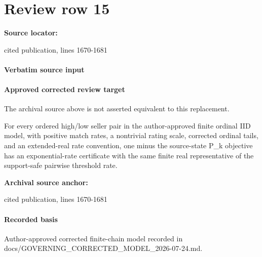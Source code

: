 \documentclass[10pt]{article}
\begin{document}
\section*{Review row 15}
\textbf{Source locator:} {\footnotesize\raggedright cited publication, lines 1670-\allowbreak{}1681\par}
\paragraph{Verbatim source input}
\begin{ReviewVerbatim}
\end{ReviewVerbatim}

\paragraph{Approved corrected review target}
The archival source above is not asserted equivalent to this replacement.
\begin{ReviewVerbatim}
For every ordered high/low seller pair in the author-approved finite ordinal IID model, with positive match rates, a nontrivial rating scale, corrected ordinal tails, and an extended-real rate convention, one minus the source-state P_k objective has an exponential-rate certificate with the same finite real representative of the support-safe pairwise threshold rate.
\end{ReviewVerbatim}

\textbf{Archival source anchor:} {\footnotesize\raggedright cited publication, lines 1670-\allowbreak{}1681\par}
\paragraph{Recorded basis}
Author-\allowbreak{}approved corrected finite-\allowbreak{}chain model recorded in docs/\allowbreak{}GOVERNING\_\allowbreak{}CORRECTED\_\allowbreak{}MODEL\_\allowbreak{}2026-\allowbreak{}07-\allowbreak{}24.\allowbreak{}md.\allowbreak{}
\end{document}
